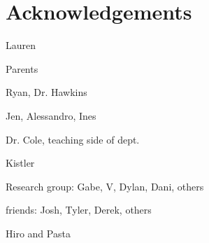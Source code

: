 \chapter*{Acknowledgements}
{}


Lauren

Parents

Ryan, Dr. Hawkins

Jen, Alessandro, Ines

Dr. Cole, teaching side of dept.

Kistler

Research group: Gabe, V, Dylan, Dani, others

friends: Josh, Tyler, Derek, others

Hiro and Pasta
